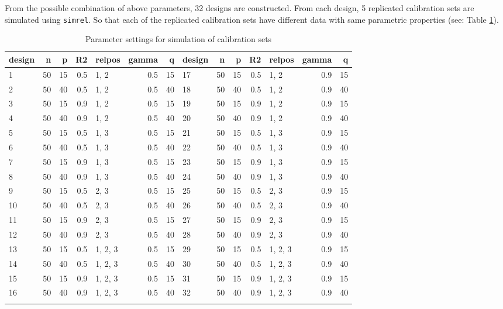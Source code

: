 \documentclass[a4paper, 11pt]{article}
\begin{document}
From the possible combination of above parameters, 32 designs are constructed. From each design, 5 replicated calibration sets are simulated using {\tt simrel}. So that each of the replicated calibration sets have different data with same parametric properties (see: Table \ref{tab:design}). 
\begin{center}
  \begin{longtable}{l|r|r|r|l|r|r||l|r|r|r|l|r|r}
    \hline
    design & n  & p  & R2  & relpos  & gamma & q  & design & n  & p  & R2  & relpos  & gamma & q\\
    \hline\hline \endhead
    1      & 50 & 15 & 0.5 & 1, 2    & 0.5   & 15 & 17     & 50 & 15 & 0.5 & 1, 2    & 0.9   & 15\\
    2      & 50 & 40 & 0.5 & 1, 2    & 0.5   & 40 &  18    & 50 & 40 & 0.5 & 1, 2    & 0.9   & 40\\
    3      & 50 & 15 & 0.9 & 1, 2    & 0.5   & 15 &  19    & 50 & 15 & 0.9 & 1, 2    & 0.9   & 15\\
    4      & 50 & 40 & 0.9 & 1, 2    & 0.5   & 40 &  20    & 50 & 40 & 0.9 & 1, 2    & 0.9   & 40\\
    5      & 50 & 15 & 0.5 & 1, 3    & 0.5   & 15 &  21    & 50 & 15 & 0.5 & 1, 3    & 0.9   & 15\\
    6      & 50 & 40 & 0.5 & 1, 3    & 0.5   & 40 &  22    & 50 & 40 & 0.5 & 1, 3    & 0.9   & 40\\
    7      & 50 & 15 & 0.9 & 1, 3    & 0.5   & 15 &  23    & 50 & 15 & 0.9 & 1, 3    & 0.9   & 15\\
    8      & 50 & 40 & 0.9 & 1, 3    & 0.5   & 40 &  24    & 50 & 40 & 0.9 & 1, 3    & 0.9   & 40\\
    9      & 50 & 15 & 0.5 & 2, 3    & 0.5   & 15 &  25    & 50 & 15 & 0.5 & 2, 3    & 0.9   & 15\\
    10     & 50 & 40 & 0.5 & 2, 3    & 0.5   & 40 &  26    & 50 & 40 & 0.5 & 2, 3    & 0.9   & 40\\
    11     & 50 & 15 & 0.9 & 2, 3    & 0.5   & 15 &  27    & 50 & 15 & 0.9 & 2, 3    & 0.9   & 15\\
    12     & 50 & 40 & 0.9 & 2, 3    & 0.5   & 40 &  28    & 50 & 40 & 0.9 & 2, 3    & 0.9   & 40\\
    13     & 50 & 15 & 0.5 & 1, 2, 3 & 0.5   & 15 &  29    & 50 & 15 & 0.5 & 1, 2, 3 & 0.9   & 15\\
    14     & 50 & 40 & 0.5 & 1, 2, 3 & 0.5   & 40 &  30    & 50 & 40 & 0.5 & 1, 2, 3 & 0.9   & 40\\
    15     & 50 & 15 & 0.9 & 1, 2, 3 & 0.5   & 15 &  31    & 50 & 15 & 0.9 & 1, 2, 3 & 0.9   & 15\\
    16     & 50 & 40 & 0.9 & 1, 2, 3 & 0.5   & 40 &  32    & 50 & 40 & 0.9 & 1, 2, 3 & 0.9   & 40\\
    \hline
    \caption[Simulation Design]{Parameter settings for simulation of calibration sets}
    \label{tab:design}
  \end{longtable}
\end{center}
\end{document}
